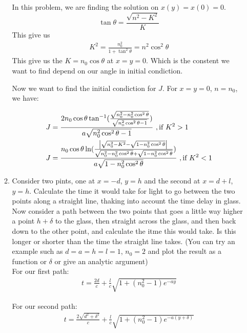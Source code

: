 \documentclass{article}
\begin{document}
\begin{enumerate}
\begin{enumerate}
        In this problem, we are finding the solution on $x(y) = x(0) = 0$.
        \[
        \tan \theta = \frac{\sqrt{n^2-K^2}}{K}
        \]
        This give us
        \begin{align*}
            K^2 = \frac{n_0^2}{1+\tan^2\theta} = n^2 \cos^2\theta
        \end{align*}
        This give us the $K = n_0\cos\theta$ at $x=y=0$. Which is the constent we want to find depend on our angle in initial condiction.

        Now we want to find the initial condiction for $J$. For $x = y = 0$, $n = n_0$, we have:

        \begin{align*}
            J &= \frac{2n_0 \cos\theta \tan^{-1}(\frac{\sqrt{n^2_0-n^2_0 \cos^2\theta}}{\sqrt{n^2_0 \cos^2\theta-1}})}{a\sqrt{n^2_0 \cos^2\theta - 1}} \ ,\text{if } K^2 > 1\\
            J &= \frac{n_0 \cos\theta \ln (\frac{\abs{\sqrt{n_0^2-K^2} - \sqrt{1-n_0^2 \cos^2\theta}}}{\sqrt{n_0^2-n_0^2 \cos^2\theta}+\sqrt{1-n_0^2 \cos^2\theta}})}{a\sqrt{1-n_0^2 \cos^2\theta}} \ ,\text{if }K^2 < 1
        \end{align*}
        
        \item Consider two pints, one at $x = -d$, $y = h$ and the second at $x = d + l$, $y = h$. Calculate the time it would take for light to go between the two points along a straight line, thaking into account the time delay in glass. Now consider a path between the two points that goes a little way higher a point $ h + \delta$ to the glass, then straight across the glass, and then back down to the other point, and calculate the itme this would take. Is this longer or shorter than the time the straight line takes. (You can try an example such as $ d = a = h = l = 1$, $n_0 = 2$ and plot the result as a function or $\delta$ or give an analytic argument)\\
        
        For our first path:
        \begin{align*}
            t = \frac{2d}{c} + \frac{l}{c} \sqrt{1+(n_0^2-1)e^{-ay}}
        \end{align*}

        For our second path:
        \begin{align*}
            t = \frac{2\sqrt{d^2 + \delta ^2}}{c} + \frac{l}{c} \sqrt{1+(n_0^2-1)e^{-a(y + \delta)}}
        \end{align*}


\end{enumerate}
\end{enumerate}
\end{document}
